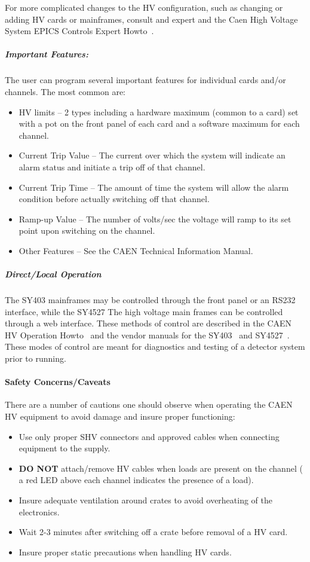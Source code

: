 For more complicated changes to the HV configuration, such as changing or
adding HV cards or mainframes, consult and expert and the Caen High
Voltage System EPICS Controls Expert Howto~\cite{howto:CAEN_HV_expert}.

\subparagraph{Important Features:}

The user can program several important features for individual
cards and/or channels.  The most common are:

\begin{itemize}
\item{HV limits -- 2 types including a hardware maximum (common to a
card) set with a pot on the front panel of each card and a software
maximum for each channel.}
\item{Current Trip Value -- The current over which the system will
indicate an alarm status and initiate a trip off of that channel.}
\item{Current Trip Time -- The amount of time the system will allow
the alarm condition before actually switching off that channel.}
\item{Ramp-up Value -- The number of volts/sec the voltage will ramp
to its set point upon switching on the channel.}
\item{Other Features -- See the CAEN Technical Information Manual.}
\end{itemize}

\subparagraph{Direct/Local Operation}
The SY403 mainframes may be controlled through the front panel or an
RS232 interface, while the SY4527 The high voltage main frames can be
controlled through a web interface.   These methods of control are
described in the CAEN HV Operation
Howto~\cite{howto:CAEN_HV_operation} and the vendor manuals for the
SY403~\cite{caensy403manual} and SY4527~\cite{caensy4527manual}.
These modes of control are meant for
diagnostics and testing of a detector system prior to running.

\paragraph{Safety Concerns/Caveats}

There are a number of cautions one should observe when operating
the CAEN HV equipment to avoid damage and insure proper functioning:

\begin{itemize}
\item{Use only proper SHV connectors and approved cables when
connecting equipment to the supply.}
\item{{\bf DO NOT} attach/remove HV cables when loads are present on the
channel ( a red LED above each channel indicates the presence of a
load).}
\item{Insure adequate ventilation around crates to avoid overheating
of the electronics.}
\item{Wait 2-3 minutes after switching off a crate before removal of a
HV card.}
\item{Insure proper static precautions when handling HV cards.}
\end{itemize}

